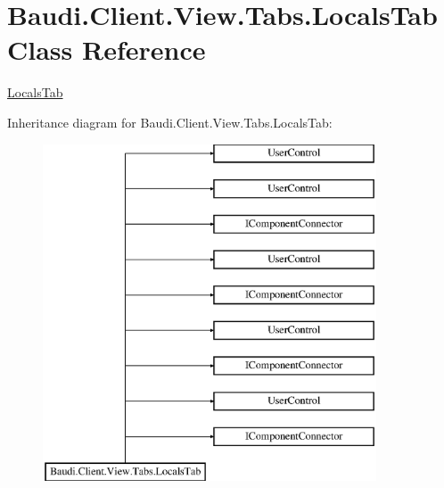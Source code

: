 \hypertarget{class_baudi_1_1_client_1_1_view_1_1_tabs_1_1_locals_tab}{}\section{Baudi.\+Client.\+View.\+Tabs.\+Locals\+Tab Class Reference}
\label{class_baudi_1_1_client_1_1_view_1_1_tabs_1_1_locals_tab}


\hyperlink{class_baudi_1_1_client_1_1_view_1_1_tabs_1_1_locals_tab}{Locals\+Tab}  


Inheritance diagram for Baudi.\+Client.\+View.\+Tabs.\+Locals\+Tab\+:\begin{figure}[H]
\begin{center}
\leavevmode
\includegraphics[height=10.000000cm]{class_baudi_1_1_client_1_1_view_1_1_tabs_1_1_locals_tab}
\end{center}
\end{figure}
